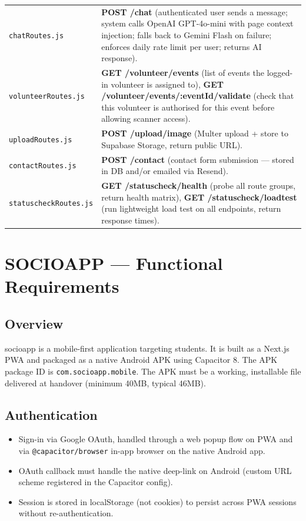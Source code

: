 \documentclass[12pt,a4paper]{article}
\begin{document}
\begin{longtable}{L{5cm} X}
\addlinespace
\texttt{chatRoutes.js} & \textbf{POST /chat} (authenticated user sends a message; system calls OpenAI GPT-4o-mini with page context injection; falls back to Gemini Flash on failure; enforces daily rate limit per user; returns AI response). \\
\addlinespace
\texttt{volunteerRoutes.js} & \textbf{GET /volunteer/events} (list of events the logged-in volunteer is assigned to), \textbf{GET /volunteer/events/:eventId/validate} (check that this volunteer is authorised for this event before allowing scanner access). \\
\addlinespace
\texttt{uploadRoutes.js} & \textbf{POST /upload/image} (Multer upload + store to Supabase Storage, return public URL). \\
\addlinespace
\texttt{contactRoutes.js} & \textbf{POST /contact} (contact form submission — stored in DB and/or emailed via Resend). \\
\addlinespace
\texttt{statuscheckRoutes.js} & \textbf{GET /statuscheck/health} (probe all route groups, return health matrix), \textbf{GET /statuscheck/loadtest} (run lightweight load test on all endpoints, return response times). \\
\bottomrule
\end{longtable}

\newpage
\section{SOCIOAPP — Functional Requirements}

\subsection{Overview}

socioapp is a mobile-first application targeting students. It is built as a Next.js PWA and packaged as a native Android APK using Capacitor 8. The APK package ID is \texttt{com.socioapp.mobile}. The APK must be a working, installable file delivered at handover (minimum 40MB, typical 46MB).

\subsection{Authentication}

\begin{itemize}[leftmargin=*]
    \item Sign-in via Google OAuth, handled through a web popup flow on PWA and via \texttt{@capacitor/browser} in-app browser on the native Android app.
    \item OAuth callback must handle the native deep-link on Android (custom URL scheme registered in the Capacitor config).
    \item Session is stored in localStorage (not cookies) to persist across PWA sessions without re-authentication.
\end{itemize}
\end{document}
